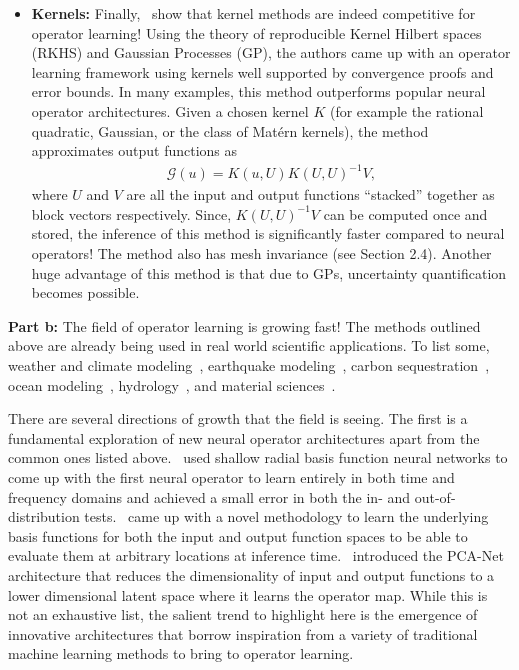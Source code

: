 \documentclass[12pt]{exam}
\def\G{\mathcal{G}}
\begin{document}
\begin{questions}
\begin{itemize}
\item {\bf Kernels:} Finally,~\citep{batlle2024kernel} show that kernel methods are indeed competitive for operator learning! Using the theory of reproducible Kernel Hilbert spaces (RKHS) and Gaussian Processes (GP), the authors came up with an operator learning framework using kernels well supported by convergence proofs and error bounds. In many examples, this method outperforms popular neural operator architectures. Given a chosen kernel $K$ (for example the rational quadratic, Gaussian, or the class of Mat\'ern kernels), the method approximates output functions as
\begin{align}
\G(u) = K(u, U) K(U, U)^{-1} V,
\end{align}
where $U$ and $V$ are all the input and output functions ``stacked'' together as block vectors respectively. Since, $K(U, U)^{-1} V$ can be computed once and stored, the inference of this method is significantly faster compared to neural operators! The method also has mesh invariance (see Section 2.4). Another huge advantage of this method is that due to GPs, uncertainty quantification becomes possible.
\end{itemize}

{\bf Part b:} The field of operator learning is growing fast! The methods outlined above are already being used in real world scientific applications. To list some, weather and climate modeling~\citep{bora2023learning, pathak2022fourcastnet, jiang2023efficient, yang2024fourier}, earthquake modeling~\citep{haghighat2024deeponet}, carbon sequestration~\citep{lee2024efficient}, ocean modeling~\citep{choi2024applications}, hydrology~\citep{sun2024bridging}, and material sciences~\citep{gupta2022towards, oommen2024rethinking}.

There are several directions of growth that the field is seeing. The first is a fundamental exploration of new neural operator architectures apart from the common ones listed above.~\citep{kurz2024radial} used shallow radial basis function neural networks to come up with the first neural operator to learn entirely in both time and frequency domains and achieved a small error in both the in- and out-of-distribution tests.~\citep{ingebrand2025basis} came up with a novel methodology to learn the underlying basis functions for both the input and output function spaces to be able to evaluate them at arbitrary locations at inference time.~\citep{bhattacharya2021model} introduced the PCA-Net architecture that reduces the dimensionality of input and output functions to a lower dimensional latent space where it learns the operator map. While this is not an exhaustive list, the salient trend to highlight here is the emergence of innovative architectures that borrow inspiration from a variety of traditional machine learning methods to bring to operator learning.


\end{questions}
\end{document}
